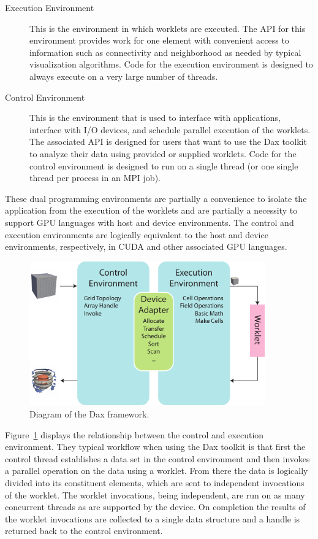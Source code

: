 \begin{description}
\item[Execution Environment]  This is the
  environment in which worklets are executed. The API for this environment
  provides work for one element with convenient access to information such
  as connectivity and neighborhood as needed by typical visualization
  algorithms. Code for the execution environment is designed to always
  execute on a very large number of threads.
\item[Control Environment]  This is the
  environment that is used to interface with applications, interface with
  I/O devices, and schedule parallel execution of the worklets. The
  associated API is designed for users that want to use the Dax toolkit to
  analyze their data using provided or supplied worklets. Code for the
  control environment is designed to run on a single thread (or one single
  thread per process in an MPI job).
\end{description}

These dual programming environments are partially a convenience to isolate
the application from the execution of the worklets and are partially a
necessity to support GPU languages with host and device environments. The
control and execution environments are logically equivalent to the host and
device environments, respectively, in CUDA and other associated
GPU languages.

\begin{figure}
  \centering
  \includegraphics[width=4in]{images/DaxDiagram}
  \caption{Diagram of the Dax framework.}
  \label{fig:DaxDiagram}
\end{figure}

Figure~\ref{fig:DaxDiagram} displays the relationship between the control
and execution environment. They typical workflow when using the Dax toolkit
is that first the control thread establishes a data set in the control
environment and then invokes a parallel operation on the data using a
worklet. From there the data is logically divided into its constituent
elements, which are sent to independent invocations of the worklet. The
worklet invocations, being independent, are run on as many concurrent
threads as are supported by the device. On completion the results of the
worklet invocations are collected to a single data structure and a handle
is returned back to the control environment.


